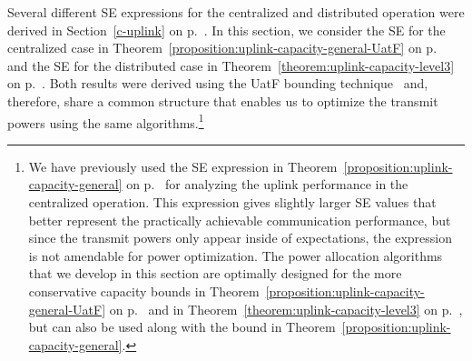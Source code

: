 Several different SE expressions for the centralized and distributed operation were derived in Section~\ref{c-uplink} on p.~\pageref{c-uplink}. In this section, we consider the SE for the centralized case in Theorem~\ref{proposition:uplink-capacity-general-UatF} on p.~\pageref{proposition:uplink-capacity-general-UatF} and the SE for the distributed case in Theorem~\ref{theorem:uplink-capacity-level3} on p.~\pageref{theorem:uplink-capacity-level3}. Both results were derived using the \gls{UatF} bounding technique~\cite[Theorem~4.4]{massivemimobook} and, therefore, share a common structure that enables us to optimize the transmit powers using the same algorithms.\footnote{We have previously used the SE expression in Theorem~\ref{proposition:uplink-capacity-general} on p.~\pageref{proposition:uplink-capacity-general} for analyzing the uplink performance in the centralized operation. This expression  gives slightly larger SE values that better represent the practically achievable communication performance, but since the transmit powers only appear inside of expectations, the expression is not amendable for power optimization. The power allocation algorithms that we develop in this section are optimally designed for the more conservative capacity bounds in Theorem~\ref{proposition:uplink-capacity-general-UatF} on p.~\pageref{proposition:uplink-capacity-general-UatF} and in Theorem~\ref{theorem:uplink-capacity-level3} on p.~\pageref{theorem:uplink-capacity-level3}, but can also be used along with the bound in Theorem~\ref{proposition:uplink-capacity-general}.} 



